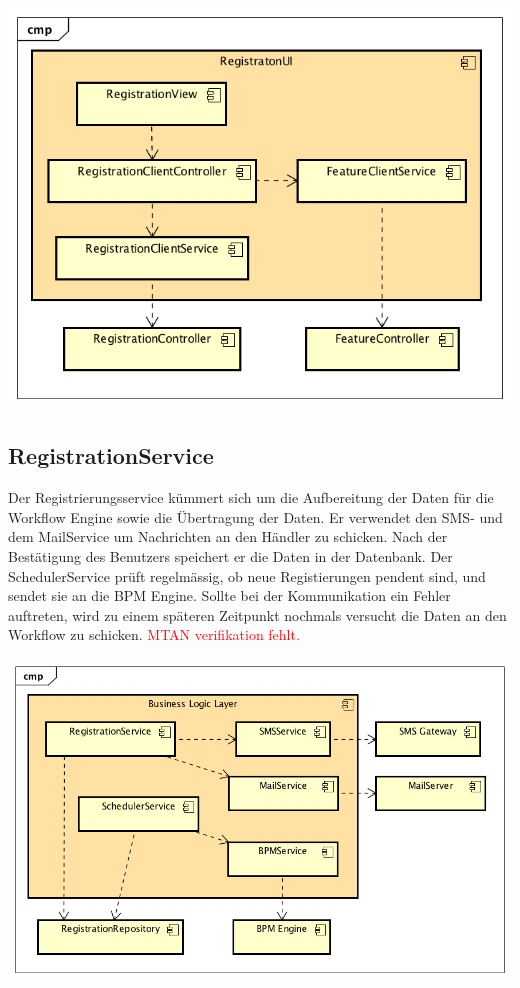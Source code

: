 \begin{center}
	\includegraphics[scale=0.8]{WebComponentLevel2.png}
\end{center}
\newpage
\subsection{RegistrationService}
\label{reg-service}

Der Registrierungsservice kümmert sich um die Aufbereitung der Daten für die Workflow Engine sowie die Übertragung der Daten. Er verwendet den SMS- und dem MailService um Nachrichten an den Händler zu schicken. Nach der Bestätigung des Benutzers speichert er die Daten in der Datenbank. Der SchedulerService prüft regelmässig, ob neue Registierungen pendent sind, und sendet sie an die BPM Engine. Sollte bei der Kommunikation ein Fehler auftreten, wird zu einem späteren Zeitpunkt nochmals versucht die Daten an den Workflow zu schicken. \textcolor{red}{MTAN verifikation fehlt.}
\begin{center}
	\includegraphics[scale=0.65]{RegistrationServicesLevel2.png}
\end{center}
